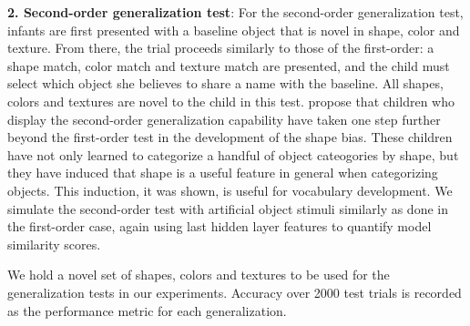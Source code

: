 {\bf2. Second-order generalization test}: For the second-order generalization
test, infants are first presented with a baseline object that is novel in shape,
color and texture. From there, the trial proceeds similarly to those of the
first-order: a shape match, color match and texture match are presented,
and the child must select which object she believes to share a name with the
baseline. All shapes, colors and textures are novel to the child in this test.
\cite{Smith2002} propose that children who display the second-order
generalization capability have taken one step further beyond the first-order
test in the development of the shape bias. These children have not only learned
to categorize a handful of object cateogories by shape, but they have induced
that shape is a useful feature in general when categorizing objects. This
induction, it was shown, is useful for vocabulary development. We simulate
the second-order test with artificial object stimuli similarly as done in the
first-order case, again using last hidden layer features to quantify model similarity
scores.

We hold a novel set of shapes, colors and textures to be used for the
generalization tests in our experiments. Accuracy over 2000 test trials is
recorded as the performance metric for each generalization.

